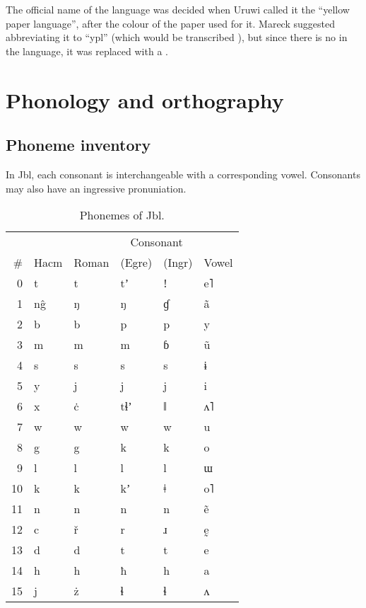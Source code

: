 \documentclass{book}
\newcommand{\lname}{Jbl}
\begin{document}
The official name of the language was decided when Uruwi called it the ``yellow paper language'', after the colour of the paper used for it. Mareck suggested abbreviating it to ``ypl'' (which would be transcribed ), but since there is no  in the language, it was replaced with a .

\chapter{Phonology and orthography}

\section{Phoneme inventory}


In \lname{}, each consonant is interchangeable with a corresponding vowel. Consonants may also have an ingressive pronuniation.

\begin{table}[h]
  \caption{Phonemes of \lname.}
  \centering
  \begin{tabular}{r|>{\kardinal}ll|lll}
    & & & \multicolumn{2}{c}{Consonant} & \\
    \# & \textnormal{Hacm} & Roman & (Egre) & (Ingr) & Vowel \\
    \hline
    0 & t & t & tʼ & ǃ & e˥ \\
    1 & n\^g & ŋ & ŋ & ɠ & ã \\
    2 & b & b & p & p & y \\
    3 & m & m & m & ɓ & ũ \\
    4 & s & s & s & s & ɨ \\
    5 & y & j & j & j & i \\
    6 & x & ċ & tɬʼ & ǁ & ʌ˥ \\
    7 & w & w & w & w & u \\
    8 & g & g & k & k & o \\
    9 & l & l & l & l & ɯ \\
    10 & k & k & kʼ & ǂ & o˥ \\
    11 & n & n & n & n & ẽ \\
    12 & c & ř & r & ɹ & ḛ \\
    13 & d & d & t & t & e \\
    14 & h & h & ħ & h & a \\
    15 & j & ż & ɬ & ɬ & ʌ \\
   \end{tabular}
\end{table}
\end{document}

